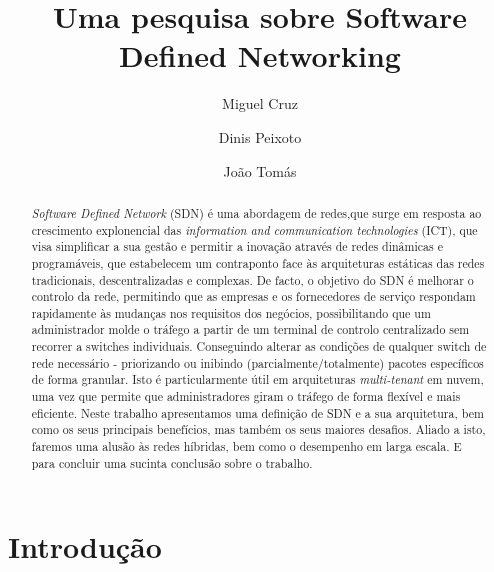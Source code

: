\documentclass{llncs}
\begin{document}
\mainmatter
\title{Uma pesquisa sobre Software Defined Networking}


\author{Miguel Cruz \and Dinis Peixoto \and João Tomás}



\date{}

\maketitle
\begin{abstract}
\textit{Software Defined Network} (SDN) é uma abordagem de redes,que surge em resposta ao crescimento explonencial das \textit{information and communication technologies} (ICT), que visa simplificar a sua gestão e permitir a inovação através de redes 
dinâmicas e programáveis, que estabelecem um contraponto face às arquiteturas estáticas das redes tradicionais, descentralizadas e complexas. De facto, o objetivo do SDN é melhorar o controlo da rede, permitindo que as empresas e os fornecedores de serviço respondam
rapidamente às mudanças nos requisitos dos negócios, possibilitando que um administrador molde o tráfego a partir de um terminal de controlo centralizado sem recorrer a switches individuais. Conseguindo alterar as condições de qualquer switch de rede necessário - priorizando ou inibindo (parcialmente/totalmente) pacotes específicos de forma granular. 
Isto é particularmente útil em arquiteturas \textit{multi-tenant} em nuvem, uma vez que permite que administradores giram o tráfego de forma flexível e mais eficiente. 
Neste trabalho apresentamos uma definição de SDN e a sua arquitetura, bem como os seus principais benefícios, mas também os seus maiores desafios. Aliado a isto, faremos uma alusão às redes híbridas, bem como o desempenho em larga escala. E para concluir uma sucinta conclusão sobre o trabalho.
\end{abstract}

\section{Introdução}
\end{document}

